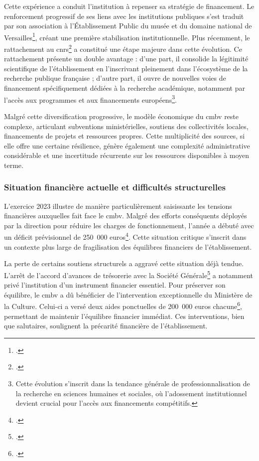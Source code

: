Cette expérience a conduit l'institution à repenser sa stratégie de financement. Le renforcement progressif de ses liens avec les institutions publiques s'est traduit par son association à l'Établissement Public du musée et du domaine national de Versailles\footcite{CentreMusiqueBaroque}, créant une première stabilisation institutionnelle. Plus récemment, le rattachement au \gls{cnrs}\footcite{CentreMusiqueBaroque} a constitué une étape majeure dans cette évolution. Ce rattachement présente un double avantage : d'une part, il consolide la légitimité scientifique de l'établissement en l'inscrivant pleinement dans l'écosystème de la recherche publique française ; d'autre part, il ouvre de nouvelles voies de financement spécifiquement dédiées à la recherche académique, notamment par l'accès aux programmes  et aux financements européens\footnote{Cette évolution s'inscrit dans la tendance générale de professionnalisation de la recherche en sciences humaines et sociales, où l'adossement institutionnel devient crucial pour l'accès aux financements compétitifs.}.

Malgré cette diversification progressive, le modèle économique du \gls{cmbv} reste complexe, articulant subventions ministérielles, soutiens des collectivités locales, financements de projets et ressources propres. Cette multiplicité des sources, si elle offre une certaine résilience, génère également une complexité administrative considérable et une incertitude récurrente sur les ressources disponibles à moyen terme.

\subsubsection{Situation financière actuelle et difficultés structurelles}

L'exercice 2023 illustre de manière particulièrement saisissante les tensions financières auxquelles fait face le \gls{cmbv}. Malgré des efforts conséquents déployés par la direction pour réduire les charges de fonctionnement, l'année a débuté avec un déficit prévisionnel de 250~000 euros\footcite{centredemusiquebaroquedeversaillesRapportActivite2023}. Cette situation critique s'inscrit dans un contexte plus large de fragilisation des équilibres financiers de l'établissement.

La perte de certains soutiens structurels a aggravé cette situation déjà tendue. L'arrêt de l'accord d'avances de trésorerie avec la Société Générale\footcite{centredemusiquebaroquedeversaillesRapportActivite2023} a notamment privé l'institution d'un instrument financier essentiel. Pour préserver son équilibre, le \gls{cmbv} a dû bénéficier de l'intervention exceptionnelle du Ministère de la Culture. Celui-ci a versé deux aides ponctuelles de 200~000 euros chacune\footcite{centredemusiquebaroquedeversaillesRapportActivite2023}, permettant de maintenir l'équilibre financier immédiat. Ces interventions, bien que salutaires, soulignent la précarité financière de l'établissement.

